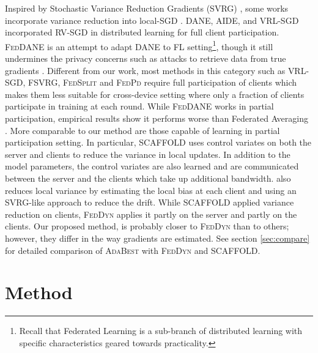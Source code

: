 \documentclass[runningheads]{llncs}
\newcommand{\scaffold}{\textsc{SCAFFOLD}\xspace}
\newcommand{\fedsplit}{\textsc{FedSplit}\xspace}
\newcommand{\fedpd}{\textsc{FedPd}\xspace}
\newcommand{\feddyn}{\textsc{FedDyn}\xspace}
\newcommand{\ours}{\textsc{AdaBest}\xspace}
\newcommand{\vrlsgd}{\textsc{VRL-SGD}\xspace}
\newcommand{\fsvrg}{\textsc{FSVRG}\xspace}
\newcommand{\dane}{\textsc{DANE}\xspace}
\newcommand{\aide}{\textsc{AIDE}\xspace}
\newcommand{\feddane}{\textsc{FedDANE}\xspace}
\newcommand{\rvsgd}{\textsc{RV-SGD}\xspace}
\newcommand{\svrg}{\textsc{SVRG}\xspace}
\begin{document}
Inspired by Stochastic Variance Reduction Gradients (\svrg) \cite{johnson2013accelerating}, some works incorporate variance reduction into local-SGD \cite{acar2021federated,li2019feddane,karimireddy2020scaffold,liang2019variance,zhang2020fedpd,konevcny2016federated,murata2021bias,nguyen2017sarah}. \dane\cite{shamir2014communication}, \aide\cite{reddi2016aide}, and \vrlsgd\cite{liang2019variance} incorporated \rvsgd in distributed learning for full client participation. \feddane\cite{li2019feddane} is an attempt to adapt \dane to FL setting\footnote{Recall that Federated Learning is a sub-branch of distributed learning with specific characteristics geared towards practicality\cite{mcmahan2017communication}.}, though it still undermines the privacy concerns such as attacks to retrieve data from true gradients \cite{zhu2020deep}. 
Different from our work, most methods in this category such as \vrlsgd \cite{liang2019variance}, \fsvrg \cite{konevcny2016federated}, \fedsplit \cite{pathak2020fedsplit} and \fedpd \cite{zhang2020fedpd} require full participation of clients which makes them less suitable for cross-device setting where only a fraction of clients participate in training at each round. While \feddane \cite{li2019feddane} works in partial participation, empirical results show it performs worse than Federated Averaging \cite{acar2021federated}. 
More comparable to our method are those capable of learning in partial participation setting. In particular, \scaffold \cite{karimireddy2020scaffold} uses control variates on both the server and clients to reduce the variance in local updates. In addition to the model parameters, the control variates are also learned and are communicated between the server and the clients which take up additional bandwidth. \cite{murata2021bias} also reduces local variance by estimating the local bias at each client and using an \svrg-like approach to reduce the drift.
While \scaffold applied variance reduction on clients, \feddyn \cite{acar2021federated} applies it partly on the server and partly on the clients.  
Our proposed method, is probably closer to \feddyn than to others; however, they differ in the way gradients are estimated. See section \ref{sec:compare} for detailed comparison of \ours with \feddyn and \scaffold. 





\section{Method}
\end{document}

